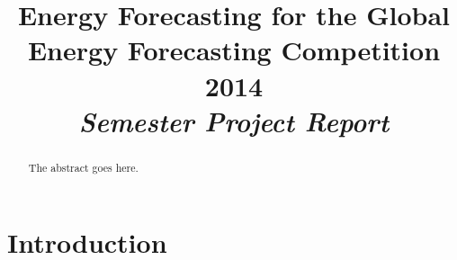 \documentclass[conference]{IEEEtran}
\begin{document}
%
\title{Energy Forecasting for the Global Energy Forecasting Competition 2014\\[10pt]\Large{\emph{Semester Project Report}}}

\author{
}

\maketitle

\begin{abstract}
The abstract goes here.
\end{abstract}


%
\IEEEpeerreviewmaketitle

\section{Introduction}
\end{document}

